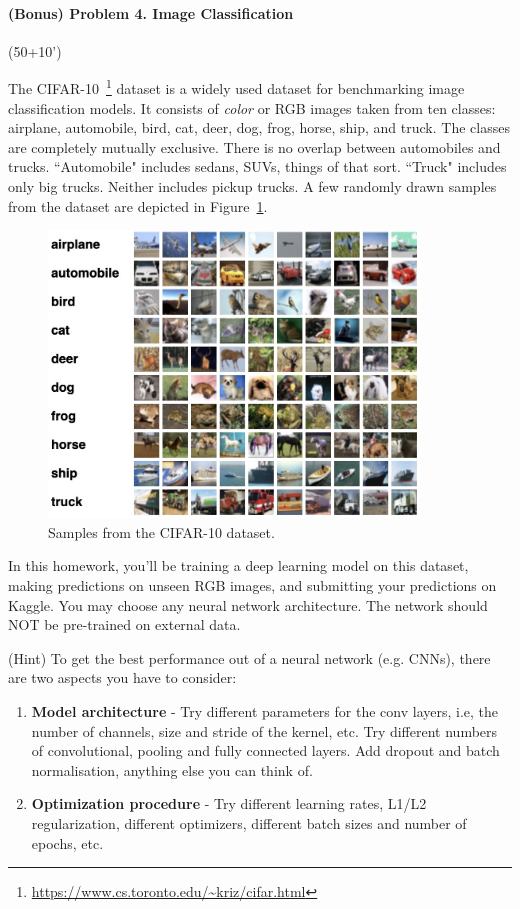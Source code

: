 \documentclass[11pt]{article}\pagestyle{plain}
\begin{document}
\paragraph{(Bonus) Problem 4. Image Classification} (50+10')

The CIFAR-10~\footnote{\url{https://www.cs.toronto.edu/~kriz/cifar.html}} dataset is a widely used dataset for benchmarking image classification models. It consists of \textit{color} or RGB images taken from ten classes: airplane, automobile, bird, cat, deer, dog, frog, horse, ship, and truck. The classes are completely mutually exclusive. There is no overlap between automobiles and trucks. ``Automobile" includes sedans, SUVs, things of that sort. ``Truck" includes only big trucks. Neither includes pickup trucks. A few randomly drawn samples from the dataset are depicted in Figure~\ref{fig1}.

\begin{figure}[h]
	\centering
	\includegraphics[height=3in]{CIFAR-10.jpg}
	\caption{Samples from the CIFAR-10 dataset.}
	\label{fig1}
\end{figure}

In this homework, you'll be training a deep learning model on this dataset, making predictions on unseen RGB images, and submitting your predictions on Kaggle. 
You may choose any neural network architecture. The network should NOT be pre-trained on external data. 


(Hint) To get the best performance out of a neural network (e.g. CNNs), there are two aspects you have to consider:
\begin{enumerate}
	\item \textbf{Model architecture} - Try different parameters for the conv layers, i.e, the number of channels, size and stride of the kernel, etc. Try different numbers of convolutional, pooling and fully connected layers. Add dropout and batch normalisation, anything else you can think of.
	\item \textbf{Optimization procedure} - Try different learning rates, L1/L2 regularization, different optimizers, different batch sizes and number of epochs, etc. 
\end{enumerate}
\end{document}
